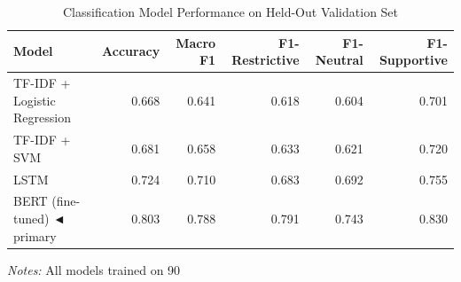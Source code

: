 \begin{table}[H]
\centering
\caption{Classification Model Performance on Held-Out Validation Set}
\label{tab:table3_model}
\begin{threeparttable}
\small
\begin{tabular}{lrrrrr}
\toprule
\textbf{Model} & \textbf{Accuracy} & \textbf{Macro F1} & \textbf{F1-Restrictive} & \textbf{F1-Neutral} & \textbf{F1-Supportive} \\
\midrule
TF-IDF + Logistic Regression & 0.668 & 0.641 & 0.618 & 0.604 & 0.701 \\
TF-IDF + SVM & 0.681 & 0.658 & 0.633 & 0.621 & 0.720 \\
LSTM & 0.724 & 0.710 & 0.683 & 0.692 & 0.755 \\
BERT (fine-tuned)  ◄ primary & 0.803 & 0.788 & 0.791 & 0.743 & 0.830 \\
\bottomrule
\end{tabular}
\begin{tablenotes}\small
\item \textit{Notes:} All models trained on 90%
\end{tablenotes}
\end{threeparttable}
\end{table}